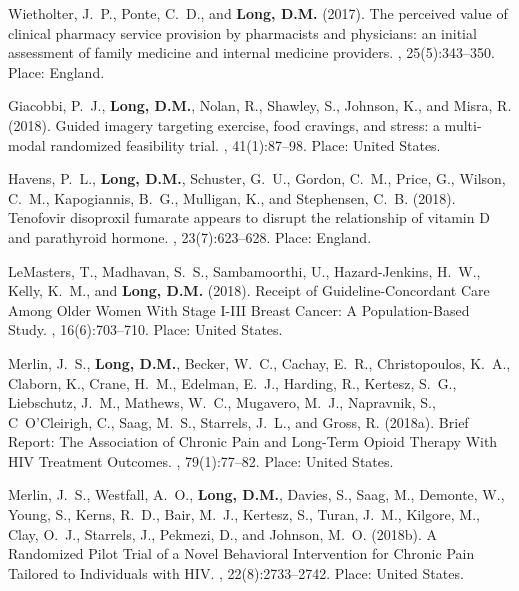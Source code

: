 \begin{thebibliography}{}
Wietholter, J.~P., Ponte, C.~D., and \textbf{Long, D.M.} (2017).
\newblock The perceived value of clinical pharmacy service provision by
  pharmacists and physicians: an initial assessment of family medicine and
  internal medicine providers.
, 25(5):343--350.
\newblock Place: England.

Giacobbi, P.~J., \textbf{Long, D.M.}, Nolan, R., Shawley, S., Johnson, K., and Misra, R.
  (2018).
\newblock Guided imagery targeting exercise, food cravings, and stress: a
  multi- modal randomized feasibility trial.
, 41(1):87--98.
\newblock Place: United States.

Havens, P.~L., \textbf{Long, D.M.}, Schuster, G.~U., Gordon, C.~M., Price, G., Wilson,
  C.~M., Kapogiannis, B.~G., Mulligan, K., and Stephensen, C.~B. (2018).
\newblock Tenofovir disoproxil fumarate appears to disrupt the relationship of
  vitamin {D} and parathyroid hormone.
, 23(7):623--628.
\newblock Place: England.

LeMasters, T., Madhavan, S.~S., Sambamoorthi, U., Hazard-Jenkins, H.~W., Kelly,
  K.~M., and \textbf{Long, D.M.} (2018).
\newblock Receipt of {Guideline}-{Concordant} {Care} {Among} {Older} {Women}
  {With} {Stage} {I}-{III} {Breast} {Cancer}: {A} {Population}-{Based} {Study}.
,
  16(6):703--710.
\newblock Place: United States.

Merlin, J.~S., \textbf{Long, D.M.}, Becker, W.~C., Cachay, E.~R., Christopoulos, K.~A.,
  Claborn, K., Crane, H.~M., Edelman, E.~J., Harding, R., Kertesz, S.~G.,
  Liebschutz, J.~M., Mathews, W.~C., Mugavero, M.~J., Napravnik, S.,
  C~O'Cleirigh, C., Saag, M.~S., Starrels, J.~L., and Gross, R. (2018a).
\newblock Brief {Report}: {The} {Association} of {Chronic} {Pain} and
  {Long}-{Term} {Opioid} {Therapy} {With} {HIV} {Treatment} {Outcomes}.
,
  79(1):77--82.
\newblock Place: United States.

Merlin, J.~S., Westfall, A.~O., \textbf{Long, D.M.}, Davies, S., Saag, M., Demonte, W.,
  Young, S., Kerns, R.~D., Bair, M.~J., Kertesz, S., Turan, J.~M., Kilgore, M.,
  Clay, O.~J., Starrels, J., Pekmezi, D., and Johnson, M.~O. (2018b).
\newblock A {Randomized} {Pilot} {Trial} of a {Novel} {Behavioral}
  {Intervention} for {Chronic} {Pain} {Tailored} to {Individuals} with {HIV}.
, 22(8):2733--2742.
\newblock Place: United States.


\end{thebibliography}
